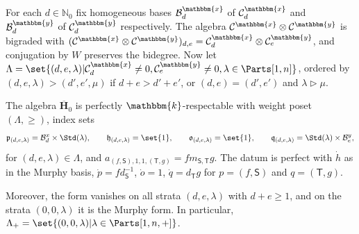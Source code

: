 \documentclass[a4paper,11pt]{amsart}
\newcommand\cB{\mathcal{B}}
\numberwithin{equation}{subsection}
\theoremstyle{definition}
\theoremstyle{theorem}
\theoremstyle{remark}
\newcommand\plam[1][\lambda]{\mathfrak{p}_{#1}}
\newcommand\hlam[1][\lambda]{\mathfrak{h}_{#1}}
\newcommand\qlam[1][\lambda]{\mathfrak{q}_{#1}}
\newcommand\olam[1][\lambda]{\mathfrak{o}_{#1}}
\newcommand\Sym{W}
\newcommand\bS{{\mathsf{S}}}
\newcommand\bT{{\mathsf{T}}}
\newcommand\N{\mathbb{N}}
\newcommand\kk{\mathbbm{k}}
\begin{document}
For each $d\in\N_0$ fix homogeneous bases $\cB^{\mathbbm{x}}_d$ of
$\mathcal{C}^{\mathbbm{x}}_d$ and $\cB^{\mathbbm{y}}_d$ of
$\mathcal{C}^{\mathbbm{y}}_d$ respectively. The algebra
$\mathcal{C}^{\mathbbm{x}}\otimes\mathcal{C}^{\mathbbm{y}}$ is bigraded
with $(\mathcal{C}^{\mathbbm{x}}\otimes
\mathcal{C}^{\mathbbm{y}})_{d,e}=\mathcal{C}_d^{\mathbbm{x}}\otimes
\mathcal{C}^{\mathbbm{y}}_e$, and conjugation by $\Sym$ preserves the
bidegree. Now let
$\Lambda=\set{(d,e,\lambda)|\mathcal{C}^{\mathbbm{x}}_d\neq0,
\mathcal{C}^{\mathbbm{y}}_e\neq0, \lambda\in \Parts[1,n]}$, ordered by
$(d,e,\lambda)>(d',e',\mu)$ if $d+e>d'+e'$, or $(d,e)=(d',e')$ and
$\lambda\vartriangleright\mu$.

\begin{Proposition}\label{P:restrictedCherednik}
  The algebra $\overline{\mathbf H}_0$ is perfectly $\kk$-respectable with
  weight poset $(\Lambda,\ge)$, index sets
  \[
    \plam[(d,e,\lambda)]=\cB^x_d\times\Std(\lambda),\qquad
    \hlam[(d,e,\lambda)]=\set{1},\qquad
    \olam[(d,e,\lambda)]=\set{1},\qquad
    \qlam[(d,e,\lambda)]=\Std(\lambda)\times\cB^y_e,
  \]
  for $(d,e,\lambda)\in\Lambda$, and $a_{(f,\bS),1,1,(\bT,g)}=fm_{\bS,\bT}g$.
The datum is perfect with $\dot h$ as in the Murphy basis, $\dot p=fd_\bS^{-1}$, $\dot o=1$, $\dot q=d_\bT g$ for $p=(f,\bS)$ and $q=(\bT,g)$.

  Moreover, the form vanishes on all strata $(d,e,\lambda)$ with
  $d+e\ge1$, and on the strata $(0,0,\lambda)$ it is the Murphy form. In
  particular, $\Lambda_+=\set{(0,0,\lambda)|\lambda\in\Parts[1,n,+]}$.
  \end{Proposition}
\end{document}
